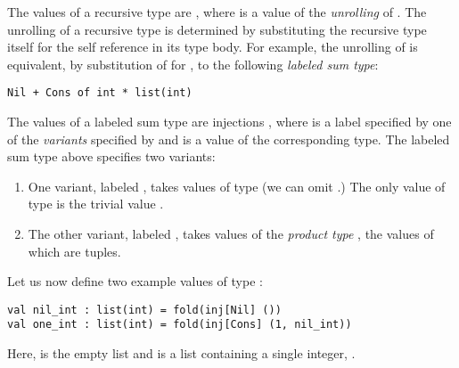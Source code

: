 The values of a recursive type  are , where  is a value of the \emph{unrolling} of . The {unrolling} of a recursive type is determined by substituting the recursive type itself for the self reference in its type body. For example, the unrolling of  is equivalent, by substitution of  for , to the following \emph{labeled sum type}:
\begin{lstlisting}[numbers=none]
Nil + Cons of int * list(int)
\end{lstlisting}
The values of a labeled sum type  are injections , where  is a label specified by one of the \emph{variants} specified by  and  is a value of the corresponding type. The {labeled sum type} above specifies two {variants}:
\begin{enumerate}
\item One variant, labeled , takes values of  type (we can omit .) The only value of  type is the trivial value \li{()}.  
\item The other variant, labeled , takes values of the \emph{product type} , the values of which are tuples. 
\end{enumerate}

Let us now define two example values of type :
\begin{lstlisting}[numbers=none]
val nil_int : list(int) = fold(inj[Nil] ())
val one_int : list(int) = fold(inj[Cons] (1, nil_int))
\end{lstlisting}
Here,  is the empty list and  is a list containing a single integer, . %

